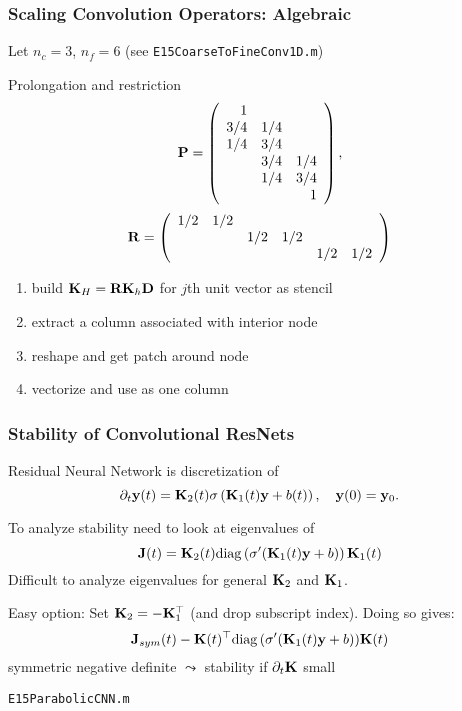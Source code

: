 \documentclass[12pt,fleqn,handout]{beamer}
\begin{document}
 \begin{frame}
 	\frametitle{Scaling Convolution Operators: Algebraic}

 Let $n_c=3$, $n_f=6$ (see \texttt{E15CoarseToFineConv1D.m})

 	Prolongation and restriction
 	$$
 		{\bf P} = \left(
 			\begin{array}{rrr}
 				1 &  \\
 				3/4 & 1/4 & \\
 				1/4 & 3/4 & \\
 				    & 3/4 & 1/4\\
 					& 1/4 & 3/4\\
					&    & 1
 			\end{array}
 		\right),
 	$$
	\pause
	$$
		{\bf R} = \left(
			\begin{array}{rrrrrr}
				1/2 & 1/2 \\
				    &     & 1/2  & 1/2 \\
					&     &     &     & 1/2 & 1/2 \\
			\end{array}
		\right)
	$$
	\pause
	\begin{enumerate}
		\item build ${\bf K}_H = {\bf R} {\bf K}_h {\bf D}$ for $j$th unit vector as stencil
		\item extract a column associated with interior node
		\item reshape and get patch around node
		\item vectorize and use as one column
	\end{enumerate}


 	\begin{center}
 		
 	\end{center}

 \end{frame}

\begin{frame}
	\frametitle{Stability of Convolutional ResNets}
	
	Residual Neural Network is discretization of 
	$$
		\partial_t {\bf y}(t) = {\bf K}_2(t) \sigma\left({\bf K}_1(t) {\bf y} + b(t)\right), \quad {\bf y}(0)= {\bf y}_0.
	$$
	\pause
	
	To analyze stability need to look at eigenvalues of 
	$$
		{\bf J}(t) = {\bf K}_2(t) {\rm diag}\left(\sigma'({\bf K}_1(t) {\bf y} + b)\right) {\bf K}_1(t)
	$$
	Difficult to analyze eigenvalues for general ${\bf K}_2$ and ${\bf K}_1$. 
	
	\pause
	
	Easy option: Set ${\bf K}_2 = - {\bf K}_1^\top$ (and drop subscript index). Doing so gives:
	$$
		{\bf J}_{sym}(t) - {\bf K}(t)^\top {{\rm diag}\left(\sigma'({\bf K}_1(t) {\bf y}+ b)\right)} {\bf K}(t)
	$$
	symmetric negative definite $\leadsto$ stability if $\partial_t {\bf K}$ small
	
	\begin{center}
		\texttt{E15ParabolicCNN.m}
	\end{center}
	
\end{frame}
\end{document}
